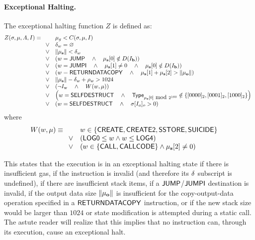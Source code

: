 \paragraph{Exceptional Halting.}\hypertarget{Exceptional_Halting_function_Z}{}
%
The exceptional halting function $Z$ is defined as:
\begin{equation}
	Z(\mathbf{\sigma}, \mathbf{\mu}, A, I) \equiv
	\begin{array}[t]{ll}
		& \mathbf{\mu}_g < C(\mathbf{\sigma}, \mathbf{\mu}, I) \quad \\
		\vee & \mathbf{\delta}_w = \varnothing \quad \\
		\vee & \lVert\mathbf{\mu}_\mathbf{s}\rVert < \mathbf{\delta}_w \quad \\
		\vee & \left( w =  \mathsf{JUMP} \quad \wedge \quad \mathbf{\mu}_\mathbf{s}[0] \notin D(I_\mathbf{b})  \right) \quad \\
		\vee & \left( w =  \mathsf{JUMPI} \quad \wedge \quad \mathbf{\mu}_\mathbf{s}[1] \neq 0 \quad \wedge \quad \mathbf{\mu}_\mathbf{s}[0] \notin D(I_\mathbf{b})  \right) \quad \\
		\vee & \left( w = \mathsf{RETURNDATACOPY} \quad \wedge \quad \mathbf{\mu}_{\mathbf{s}}[1] + \mathbf{\mu}_{\mathbf{s}}[2] > \lVert\mathbf{\mu}_{\mathbf{o}}\rVert \right) \quad \\
		\vee & \lVert\mathbf{\mu}_\mathbf{s}\rVert - \mathbf{\delta}_w + \mathbf{\rho}_w > 1024 \quad\\ 
		\vee & \left(\neg I_{\mathrm{w}} \quad \wedge \quad W(w, \mathbf{\mu})\right)\quad \\
		\vee & \left( w = \mathsf{SELFDESTRUCT} \quad \wedge \quad \mathsf{Type}_{\mathbf{\mu}_{\mathbf{s}}[0]\mbox{ mod }2^{160}}\notin {\left \{{\ensuremath{[0000]_2},\ensuremath{[0001]_2},\ensuremath{[1000]_2}} \right \}}\right) \\
		\vee & \left( w = \mathsf{SELFDESTRUCT} \quad \wedge \quad \mathbf{\sigma}[I_a]_o> 0\right)
	\end{array}
\end{equation}
where
\begin{equation}
W(w, \mathbf{\mu}) \equiv \\
\begin{array}[t]{ll}
	& w \in \{ \mathsf{CREATE},  \mathsf{CREATE2},  \mathsf{SSTORE}, \mathsf{SUICIDE}\} \quad \\
	\vee & \left(\mathsf{LOG0} \le w \wedge w \le  \mathsf{LOG4} \right)\\
	\vee & \left(w \in \{ \mathsf{CALL},  \mathsf{CALLCODE}\} \wedge \mathbf{\mu}_{\mathbf{s}}[2] \neq 0\right)
\end{array}
\end{equation}

This states that the execution is in an exceptional halting state if there is insufficient gas, if the instruction is invalid (and therefore its $\mathbf{\delta}$ subscript is undefined), if there are insufficient stack items, if a $\mathsf{JUMP}$/$\mathsf{JUMPI}$ destination is invalid, 
if the output data size $\lVert\mathbf{\mu}_{\mathbf{o}}\rVert$ is insufficient for the copy-output-data operation specified in a $\mathsf{RETURNDATACOPY}$ instruction,
or if the new stack size would be larger than $1024$ or state modification is attempted during a static call. The astute reader will realize that this implies that no instruction can, through its execution, cause an exceptional halt.

